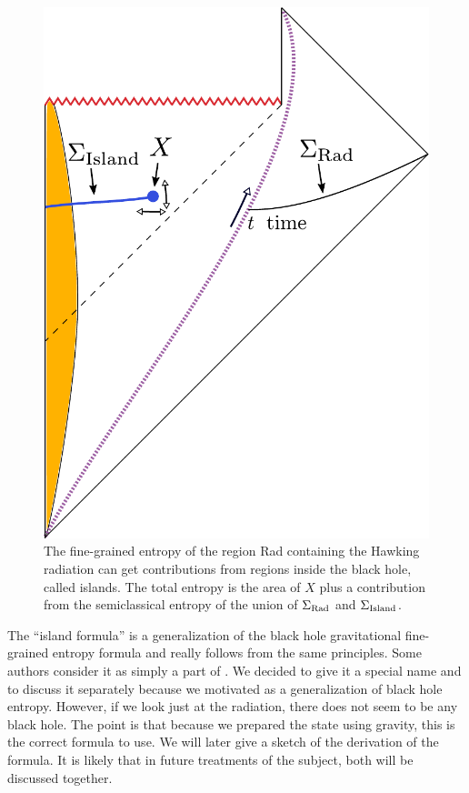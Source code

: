 \begin{figure}[t]
\begin{center}
\includegraphics[scale=0.4]{figures/islandprocedure.pdf}
\caption{The  fine-grained entropy of the region Rad containing the Hawking radiation can get contributions from regions inside the black hole, called islands. The total entropy is the area of $X$ plus a   contribution from the semiclassical entropy of the union of $\Sigma_{\rm Rad}$ and $\Sigma_{\rm Island}$.}
\label{islandprocedure}
\end{center}
\end{figure}

The ``island formula''  is a generalization of the black hole gravitational  fine-grained entropy formula  and really follows from the same principles. Some authors consider it as simply a part of . We decided to give it a special name and to discuss it separately because we motivated  as a generalization of black hole entropy. However, if we look just at the radiation, there does not seem to be any black hole.  The point is that because we prepared the state using gravity, this is the correct formula to use. We will later give a sketch of the derivation of the formula. It is likely that in future treatments of the subject, both will be discussed together. 

